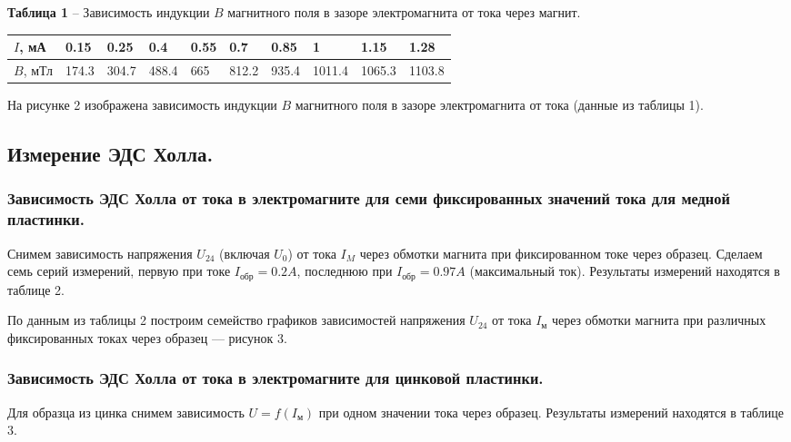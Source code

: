 \documentclass[12pt,a4paper]{article}
\begin{document}
        \begin{table}[!h]
            \begin{flushleft}%
           		\textbf{Таблица 1} -- Зависимость индукции $B$ магнитного поля в зазоре электромагнита от тока через магнит.\\
            \end{flushleft}
            \begin{center}
                \begin{tabular}{ | l | l | l | l | l | l | l | l | l | l |}
                    \hline
                    $I$, мА &   0.15    &   0.25    &   0.4     &   0.55    &   0.7     &   0.85    &   1       &   1.15    &   1.28    \\
                    \hline
                    $B$, мТл&   174.3   &   304.7   &   488.4   &   665     &   812.2   &   935.4   &   1011.4  &   1065.3  &   1103.8  \\
                    \hline                
                \end{tabular}
            \end{center}
        \end{table}
    
        На рисунке 2 изображена зависимость индукции $B$ магнитного поля в зазоре электромагнита от тока (данные из таблицы 1). 
        
    \subsection{Измерение ЭДС Холла.}
        \subsubsection{Зависимость ЭДС Холла от тока в электромагните для семи фиксированных    значений тока для медной пластинки.}
            Снимем зависимость напряжения $U_{24}$ (включая $U_0$) от тока $I_M$ через обмотки магнита при фиксированном токе через образец. Сделаем семь серий измерений, первую  при токе $I_\text{обр} = 0.2A$, последнюю при $I_\text{обр} = 0.97A$ (максимальный ток). Результаты измерений находятся в таблице 2. 
        
            По данным из таблицы 2 построим семейство графиков зависимостей напряжения $U_{24}$ от тока $I_\text{м}$ через обмотки магнита при различных фиксированных токах через образец --- рисунок 3.
        
        \subsubsection{Зависимость ЭДС Холла от тока в электромагните для цинковой пластинки.}
            Для образца из цинка снимем зависимость $U = f(I_\text{м})$ при одном значении тока через образец. Результаты измерений находятся в таблице 3. 
        
\end{document}
